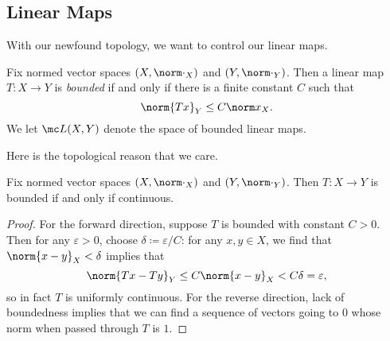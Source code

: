 \documentclass[../notes.tex]{subfiles}
\begin{document}
\subsection{Linear Maps}
With our newfound topology, we want to control our linear maps.
\begin{definition}[bounded]
	Fix normed vector spaces $(X,\norm\cdot_X)$ and $(Y,\norm\cdot_Y)$. Then a linear map $T\colon X\to Y$ is \textit{bounded} if and only if there is a finite constant $C$ such that
	\[\norm{Tx}_Y\le C\norm x_X.\]
	We let $\mc L(X,Y)$ denote the space of bounded linear maps.
\end{definition}
Here is the topological reason that we care.
\begin{lemma}
	Fix normed vector spaces $(X,\norm\cdot_X)$ and $(Y,\norm\cdot_Y)$. Then $T\colon X\to Y$ is bounded if and only if continuous.
\end{lemma}
\begin{proof}
	For the forward direction, suppose $T$ is bounded with constant $C>0$. Then for any $\varepsilon>0$, choose $\delta\coloneqq\varepsilon/C$: for any $x,y\in X$, we find that $\norm{x-y}_X<\delta$ implies that
	\[\norm{Tx-Ty}_Y\le C\norm{x-y}_X<C\delta=\varepsilon,\]
	so in fact $T$ is uniformly continuous. For the reverse direction, lack of boundedness implies that we can find a sequence of vectors going to $0$ whose norm when passed through $T$ is $1$.
\end{proof}
\end{document}

